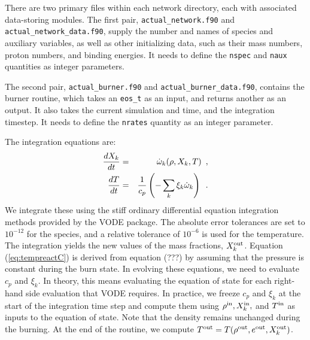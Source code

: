 \documentclass[11pt]{book}
\def\omegadot {\dot\omega}
\def\inp  {{\rm in}}
\def\outp {{\rm out}}
\begin{document}
There are two primary files within each network directory, each with associated
data-storing modules. The first pair, {\tt actual\_network.f90} and
{\tt actual\_network\_data.f90}, supply the number and names of species and
auxiliary variables, as well as other initializing data, 
such as their mass numbers, proton numbers, and binding energies. It needs to 
define the {\tt nspec} and {\tt naux} quantities as integer parameters.

The second pair, {\tt actual\_burner.f90} and {\tt actual\_burner\_data.f90},
contains the burner routine, which takes an {\tt eos\_t} as an input, and
returns another as an output. It also takes the current simulation and time,
and the integration timestep. It needs to define the {\tt nrates} quantity as
an integer parameter.

The integration equations are:
\begin{eqnarray}
\frac{dX_k}{dt} &=& \omegadot_k(\rho,X_k,T)\enskip, \label{eq:VODE1C} \\
\frac{dT}{dt} &=&\frac{1}{c_p} \left ( -\sum_k \xi_k  \omegadot_k  \right )\enskip. \label{eq:tempreactC}
\end{eqnarray}
We integrate these using the stiff ordinary differential equation integration methods
provided by the VODE package.  The absolute error tolerances are set
to $10^{-12}$ for the species, and a relative tolerance of $10^{-6}$
is used for the temperature.  The integration yields the new values of
the mass fractions, $X_k^\outp$.  Equation (\ref{eq:tempreactC}) is
derived from equation (???) by assuming that the pressure is constant
during the burn state.  In evolving these equations, we need to
evaluate $c_p$ and $\xi_k$.  In theory, this means evaluating the
equation of state for each right-hand side evaluation that VODE
requires.  In practice, we freeze $c_p$ and $\xi_k$ at the start of
the integration time step and compute them using $\rho^\inp,
X_k^\inp,$ and $T^\inp$ as inputs to the equation of state.  Note that
the density remains unchanged during the burning.  At the end of the
routine, we compute $T^\outp = T(\rho^\outp,e^{\outp},X_k^\outp)$.

\backmatter

\renewcommand\bibname{References}


\end{document}
